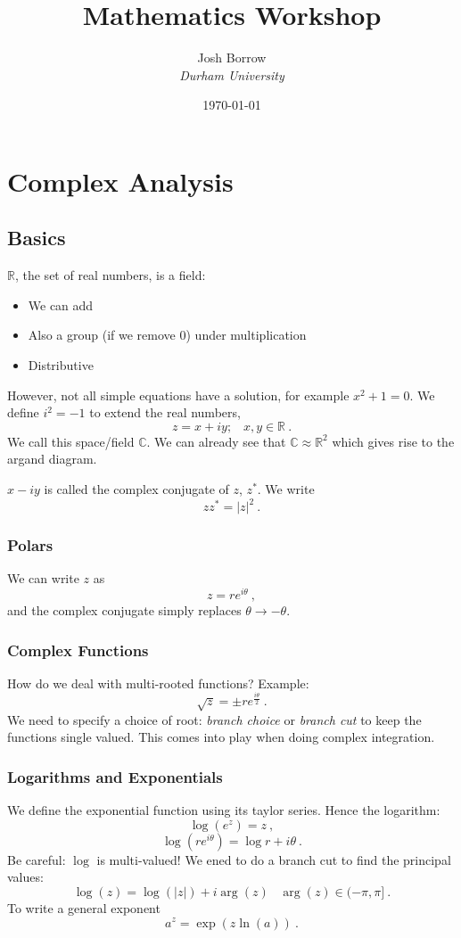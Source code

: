 \documentclass[11pt, a4paper]{report}
\begin{document}
\title{Mathematics Workshop}
\author{Josh Borrow \\ \emph{Durham University}}
\date{\today}
\maketitle

\chapter{Complex Analysis}

\section{Basics}

$\mathbb{R}$, the set of real numbers, is a field:
\begin{itemize}
	\item We can add
	\item Also a group (if we remove $0$) under multiplication
	\item Distributive
\end{itemize}
However, not all simple equations have a solution, for example $x^2 + 1 = 0$.
We define $i^2 = -1$ to extend the real numbers,
$$
	z = x+iy; \;\;\;x,y\in\mathbb{R}~.
$$
We call this space/field $\mathbb{C}$.
We can already see that $\mathbb{C}\approx\mathbb{R}^2$ which gives rise to the argand diagram.

$x-iy$ is called the complex conjugate of $z$, $z^*$. We write
$$
	z z^* = |z|^2~.
$$

\subsection{Polars}
We can write $z$ as
$$
	z = re^{i\theta}~,
$$
and the complex conjugate simply replaces $\theta \rightarrow - \theta$.

\subsection{Complex Functions}
How do we deal with multi-rooted functions?
Example:
$$
	\sqrt{z} = \pm r e^\frac{i\theta}{2}~.
$$
We need to specify a choice of root: \emph{branch choice} or \emph{branch cut} to keep the functions single valued.
This comes into play when doing complex integration.

\subsection{Logarithms and Exponentials}
We define the exponential function using its taylor series.
Hence the logarithm:
$$
	\log(e^z) = z~,
$$
$$
	\log(re^{i\theta}) = \log r + i\theta~.
$$
Be careful: $\log$ is multi-valued!
We ened to do a branch cut to find the principal values:
$$
	\log(z) = \log(|z|) + i\arg(z) \; \; \; \arg(z) \in (-\pi, \pi]~.
$$
To write a general exponent
$$
	a^z = \exp(z\ln(a))~.
$$
\end{document}
